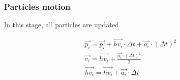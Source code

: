 \subsubsection{Particles motion}

In this stage, all particles are updated.

\[
\begin{split}
&\vec{p_i} = \vec{p_i} + \overrightarrow{hv_i} \cdot \Delta t + \vec{a_i} \cdot (\Delta t)^2\\
&\vec{v_i} = \overrightarrow{hv_i} + \frac{\vec{a_i} \cdot (\Delta t)^2}{2}\\
&\overrightarrow{hv_i} = \overrightarrow{hv_i} + \vec{a_i} \cdot \Delta t
\end{split}
\]
